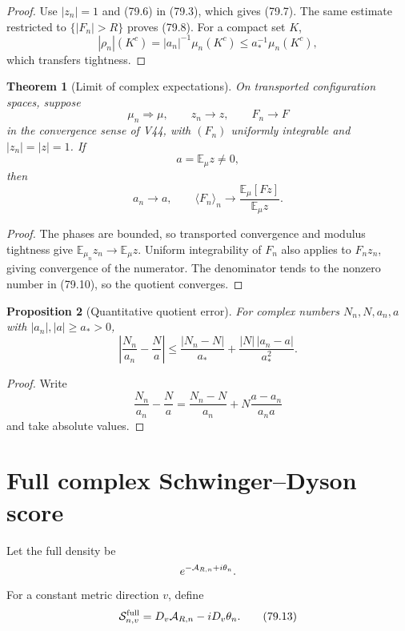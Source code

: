 \documentclass[11pt]{article}
\newtheorem{theorem}{Theorem}[section]
\newtheorem{proposition}[theorem]{Proposition}
\theoremstyle{remark}
\begin{document}
\begin{proof}
Use \(|z_n|=1\) and (79.6) in (79.3), which gives (79.7).
The same estimate restricted to \(\{|F_n|>R\}\) proves (79.8).
For a compact set \(K\),
\[
 |\rho_n|(K^c)=|a_n|^{-1}\mu_n(K^c)
 \leq a_*^{-1}\mu_n(K^c),
\]
which transfers tightness.
\end{proof}

\begin{theorem}[Limit of complex expectations]
\label{thm:v15v79-limit}
On transported configuration spaces, suppose
\[
 \mu_n\Longrightarrow\mu,\qquad z_n\to z,\qquad F_n\to F
                                                               \tag{79.9}
\]
in the convergence sense of V44, with
\((F_n)\) uniformly integrable and \(|z_n|=|z|=1\).
If
\[
 a=\mathbb E_\mu z\ne0,                               \tag{79.10}
\]
then
\[
 a_n\to a,\qquad
 \langle F_n\rangle_n
 \longrightarrow
 \frac{\mathbb E_\mu[Fz]}{\mathbb E_\mu z}.            \tag{79.11}
\]
\end{theorem}

\begin{proof}
The phases are bounded, so transported convergence and modulus
tightness give
\(\mathbb E_{\mu_n}z_n\to\mathbb E_\mu z\).
Uniform integrability of \(F_n\) also applies to \(F_nz_n\), giving
convergence of the numerator.  The denominator tends to the
nonzero number in (79.10), so the quotient converges.
\end{proof}

\begin{proposition}[Quantitative quotient error]
\label{prop:v15v79-error}
For complex numbers \(N_n,N,a_n,a\) with
\(|a_n|,|a|\geq a_*>0\),
\[
 \left|\frac{N_n}{a_n}-\frac{N}{a}\right|
 \leq
 \frac{|N_n-N|}{a_*}
 +\frac{|N|\,|a_n-a|}{a_*^2}.                         \tag{79.12}
\]
\end{proposition}


\begin{proof}
Write
\[
 \frac{N_n}{a_n}-\frac Na
 =
 \frac{N_n-N}{a_n}
 +N\frac{a-a_n}{a_na}
\]
and take absolute values.
\end{proof}

\section{Full complex Schwinger--Dyson score}

Let the full density be
\[
 e^{-{\cal A}_{R,n}+i\theta_n}.
\]
For a constant metric direction \(v\), define
\[
 {\cal S}^{\rm full}_{n,v}
 =
 D_v{\cal A}_{R,n}-iD_v\theta_n.                      \tag{79.13}
\]
\end{document}
